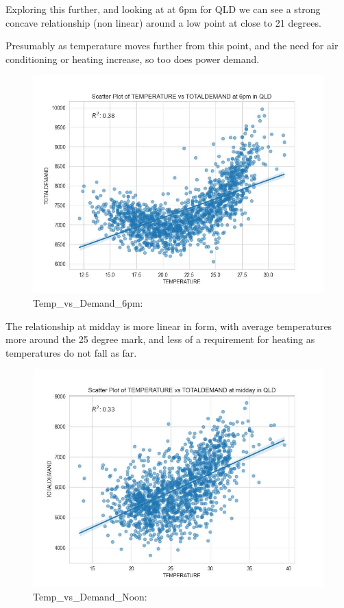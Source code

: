 \documentclass[
]{article}
\begin{document}
Exploring this further, and looking at at 6pm for QLD we can see a
strong concave relationship (non linear) around a low point at close to
21 degrees.

Presumably as temperature moves further from this point, and the need
for air conditioning or heating increase, so too does power demand.

\begin{figure}
\centering
\includegraphics{img/Temp_vs_Demand_6pm.jpg}
\caption{Temp\_vs\_Demand\_6pm:}
\end{figure}

The relationship at midday is more linear in form, with average
temperatures more around the 25 degree mark, and less of a requirement
for heating as temperatures do not fall as far.

\begin{figure}
\centering
\includegraphics{img/Temp_vs_Demand_Noon.jpg}
\caption{Temp\_vs\_Demand\_Noon:}
\end{figure}
\end{document}
